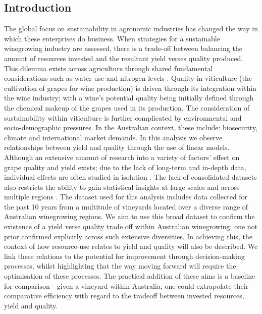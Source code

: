\documentclass[review,12pt,authoryear]{elsarticle}
\begin{document}
\begin{linenumbers}
\section{Introduction}
The global focus on sustainability in agronomic industries has changed the way in which these enterprises do business. When strategies for a sustainable winegrowing industry are assessed, there is a trade-off between balancing the amount of resources invested and the resultant yield verses quality produced. This dilemma exists across agriculture through shared fundamental considerations such as water use and nitrogen levels \citep{hemmingCherryTomatoProduction2020,kawasakiQualityMattersMore2016, zhuEffectsNitrogenLevel2017}. Quality in viticulture (the cultivation of grapes for wine production) is driven through its integration within the wine industry; with a wine's potential quality being initially defined through the chemical makeup of the grapes used in its production. The consideration of sustainability within viticulture is further complicated by environmental and socio-demographic pressures. In the Australian context, these include: biosecurity, climate and international market demands.
\newline
In this analysis we observe relationships between yield and quality through the use of linear models. Although an extensive amount of research into a variety of factors' effect on grape quality and yield exists; due to the lack of long-term and in-depth data, individual effects are often studied in isolation \citep{abbalDecisionSupportSystem2016}. The lack of consolidated datasets also restricts the ability to gain statistical insights at large scales and across multiple regions \citep{keithjonesAustralianWineIndustry2002,knightFirmResourcesDevelopment2019}. The dataset used for this analysis includes data collected for the past 10 years from a multitude of vineyards located over a diverse range of Australian winegrowing regions.
\newline
We aim to use this broad dataset to confirm the existence of a yield verse quality trade off within Australian winegrowing; one not prior confirmed explicitly across such extensive diversities.
In achieving this, the context of how resource-use relates to yield and quality will also be described.
We link these relations to the potential for improvement through decision-making processes, whilst highlighting that the way moving forward will require the optimisation of these processes. The practical addition of these aims is a baseline for comparison - given a vineyard within Australia, one could extrapolate their comparative efficiency with regard to the tradeoff between invested resources, yield and quality.

\end{linenumbers}
\end{document}
